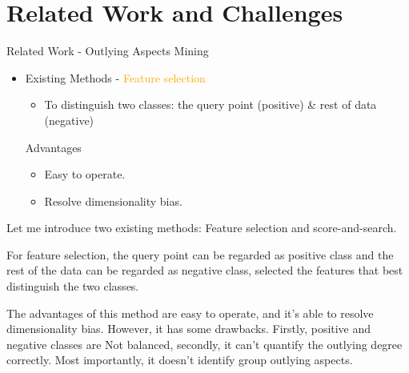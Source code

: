 \documentclass[
 size=14pt,
 paper=smartboard,  %
 mode=present, 		%
 display=slides, 	%
 style=tuliplab,  	%
 pauseslide,
 fleqn,leqno]{powerdot}
\begin{document}
\section{Related Work and Challenges}


\begin{slide}{Related Work - Outlying Aspects Mining}
\begin{itemize}
\item
Existing Methods - \textcolor{orange}{Feature selection}

\begin{itemize}
\item
To distinguish two classes:
the query point (positive) \& rest of data (negative)
\end{itemize}
\vspace{1cm}
{
Advantages
\begin{itemize}
\item
\smallskip
Easy to operate.

\item
\smallskip
Resolve dimensionality bias.
\end{itemize}
}
\end{itemize}

\begin{note}
Let me introduce two existing methods:
Feature selection and score-and-search.

For feature selection,
the query point can be regarded as positive class and
the rest of the data can be regarded as negative class,
selected the features that best distinguish the two classes.

The advantages of this method are easy to operate,
and it's able to resolve dimensionality bias.
However, it has some drawbacks.
Firstly,
positive and negative classes are Not balanced,
secondly,
it can't quantify the outlying degree correctly.
Most importantly,
it doesn't identify group outlying aspects.
\end{note}

\end{slide}
\end{document}
